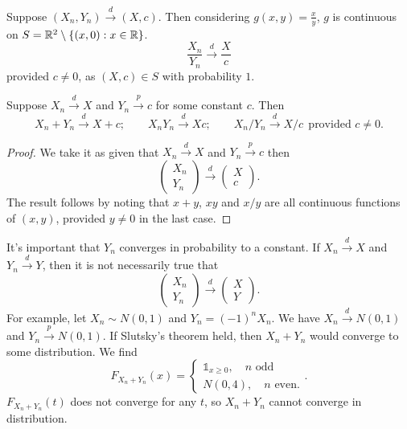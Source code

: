 \begin{remark}	Suppose $(X_n,Y_n)\xrightarrow{d}(X,c)$. Then considering $g(x,y) = \frac{x}{y}$, $g$ is continuous on $S = \mathbb{R}^2 \setminus \{(x,0): x \in \mathbb{R}\}$.
	\[
		\frac{X_n}{Y_n}\xrightarrow{d}\frac{X}{c}
	\]
	provided $c\ne 0$, as $(X,c) \in S$ with probability $1$.
\end{remark}

\begin{theorem}[Slutsky]
	Suppose $X_n\xrightarrow{d}X$ and $Y_n\xrightarrow{p}c$ for some constant $c$. Then
	\[
		X_n+Y_n\xrightarrow{d}X+c;
		\qquad
		X_nY_n\xrightarrow{d}Xc;
		\qquad
		X_n/Y_n\xrightarrow{d}X/c\ \ \text{provided }c\ne 0.
	\]
\end{theorem}

\begin{proof}
	We take it as given that $X_n\xrightarrow{d}X$ and $Y_n\xrightarrow{p}c$ then
	\[
		\begin{pmatrix}X_n\\ Y_n\end{pmatrix}\xrightarrow{d}\begin{pmatrix}X\\ c\end{pmatrix}.
	\]
	The result follows by noting that $x+y$, $xy$ and $x/y$ are all continuous functions of $(x,y)$, provided $y\ne 0$ in the last case.
\end{proof}

\begin{remark}	It's important that $Y_n$ converges in probability to a constant. If $X_n\xrightarrow{d}X$ and $Y_n\xrightarrow{d}Y$, then it is not necessarily true that
	\[
		\begin{pmatrix}X_n\\ Y_n\end{pmatrix}\xrightarrow{d}\begin{pmatrix}X\\ Y\end{pmatrix}.
	\]
	For example, let $X_n \sim N(0,1)$ and $Y_n = (-1)^{n}X_n$. We have $X_n \xrightarrow{d} N(0,1)$ and $Y_n \xrightarrow{p} N(0,1)$. If Slutsky's theorem held, then $X_n + Y_n$ would converge to some distribution. We find \[F_{X_n + Y_n}(x) =
		\begin{cases}
			\mathds{1}_{x \ge 0},\quad n \text{ odd} \\
			N(0,4), \quad n \text{ even}.
		\end{cases}.\]
	$F_{X_n + Y_n}(t)$ does not converge for any $t$, so $X_n + Y_n$ cannot converge in distribution.
\end{remark}

